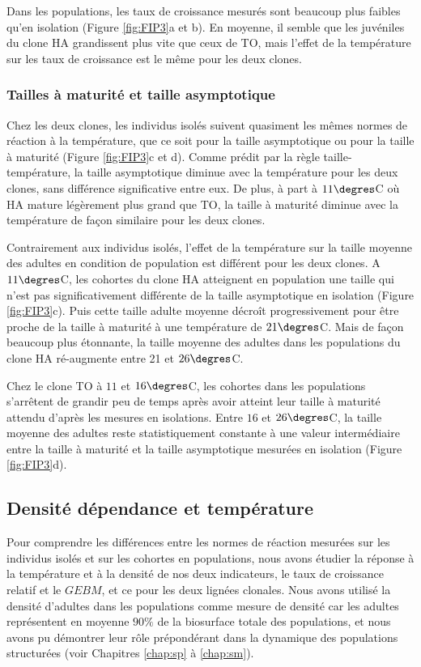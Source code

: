 Dans les populations, les taux de croissance mesurés sont beaucoup plus faibles
qu'en isolation (Figure \ref{fig:FIP3}a et b). En moyenne, il semble que les
juvéniles du clone HA grandissent plus vite que ceux de TO, mais l'effet de la
température sur les taux de croissance est le même pour les deux clones. 

\subsubsection{Tailles à maturité et taille asymptotique}

Chez les deux clones, les individus isolés suivent quasiment les mêmes normes de
réaction à la température, que ce soit pour la taille asymptotique ou pour la
taille à maturité (Figure \ref{fig:FIP3}c et d). Comme prédit par la règle
taille-température, la taille asymptotique diminue avec la température pour les
deux clones, sans différence significative entre eux. De plus, à part à
$11\degres$C où HA mature légèrement plus grand que TO, la taille à maturité
diminue avec la température de façon similaire pour les deux clones. 

Contrairement aux individus isolés, l'effet de la température sur la taille
moyenne des adultes en condition de population est différent pour les deux
clones. A $11\degres$C, les cohortes du clone HA atteignent en population une
taille qui n'est pas significativement différente de la taille asymptotique en
isolation (Figure \ref{fig:FIP3}c). Puis cette taille adulte moyenne décroît
progressivement pour être proche de la taille à maturité à une température de $21\degres$C. Mais de façon
beaucoup plus étonnante, la taille moyenne des adultes dans les populations du
clone HA ré-augmente entre 21 et $26\degres$C. 

Chez le clone TO à $11$ et $16\degres$C, les cohortes dans les populations
s'arrêtent de grandir peu de temps après avoir atteint leur taille à maturité
attendu d'après les mesures en isolations. Entre $16$ et $26\degres$C, la taille
moyenne des adultes reste statistiquement constante à une valeur intermédiaire
entre la taille à maturité et la taille asymptotique mesurées en isolation
(Figure \ref{fig:FIP3}d).

\subsection{Densité dépendance et température}

Pour comprendre les différences entre les normes de réaction mesurées sur les
individus isolés et sur les cohortes en populations, nous avons étudier la
réponse à la température et à la densité de nos deux indicateurs, le taux de
croissance relatif et le $GEBM$, et ce pour les deux lignées clonales. Nous
avons utilisé la densité d'adultes dans les populations comme mesure de densité
car les adultes représentent en moyenne $90\%$ de la biosurface totale des
populations, et nous avons pu démontrer leur rôle prépondérant dans la dynamique
des populations structurées (voir Chapitres \ref{chap:sp} à \ref{chap:sm}). 

